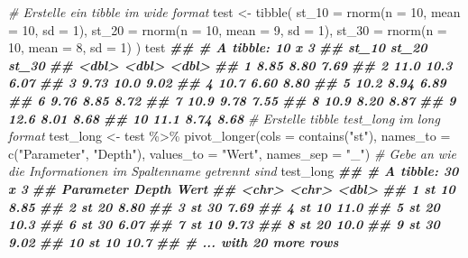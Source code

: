 \documentclass[
]{article}
\newenvironment{Shaded}{\begin{snugshade}}{\end{snugshade}}
\newcommand{\AttributeTok}[1]{\textcolor[rgb]{0.77,0.63,0.00}{#1}}
\newcommand{\CommentTok}[1]{\textcolor[rgb]{0.56,0.35,0.01}{\textit{#1}}}
\newcommand{\DecValTok}[1]{\textcolor[rgb]{0.00,0.00,0.81}{#1}}
\newcommand{\DocumentationTok}[1]{\textcolor[rgb]{0.56,0.35,0.01}{\textbf{\textit{#1}}}}
\newcommand{\FunctionTok}[1]{\textcolor[rgb]{0.00,0.00,0.00}{#1}}
\newcommand{\NormalTok}[1]{#1}
\newcommand{\OtherTok}[1]{\textcolor[rgb]{0.56,0.35,0.01}{#1}}
\newcommand{\SpecialCharTok}[1]{\textcolor[rgb]{0.00,0.00,0.00}{#1}}
\newcommand{\StringTok}[1]{\textcolor[rgb]{0.31,0.60,0.02}{#1}}
\begin{document}
\begin{Shaded}
\begin{Highlighting}[]
\CommentTok{\# Erstelle ein tibble im wide format}
\NormalTok{test }\OtherTok{\textless{}{-}} \FunctionTok{tibble}\NormalTok{(}
  \AttributeTok{st\_10 =} \FunctionTok{rnorm}\NormalTok{(}\AttributeTok{n =} \DecValTok{10}\NormalTok{, }\AttributeTok{mean =} \DecValTok{10}\NormalTok{, }\AttributeTok{sd =} \DecValTok{1}\NormalTok{), }
  \AttributeTok{st\_20 =} \FunctionTok{rnorm}\NormalTok{(}\AttributeTok{n =} \DecValTok{10}\NormalTok{, }\AttributeTok{mean =} \DecValTok{9}\NormalTok{, }\AttributeTok{sd =} \DecValTok{1}\NormalTok{), }
  \AttributeTok{st\_30 =} \FunctionTok{rnorm}\NormalTok{(}\AttributeTok{n =} \DecValTok{10}\NormalTok{, }\AttributeTok{mean =} \DecValTok{8}\NormalTok{, }\AttributeTok{sd =} \DecValTok{1}\NormalTok{) }
\NormalTok{)}
\NormalTok{test}
\DocumentationTok{\#\# \# A tibble: 10 x 3}
\DocumentationTok{\#\#    st\_10 st\_20 st\_30}
\DocumentationTok{\#\#    \textless{}dbl\textgreater{} \textless{}dbl\textgreater{} \textless{}dbl\textgreater{}}
\DocumentationTok{\#\#  1  8.85  8.80  7.69}
\DocumentationTok{\#\#  2 11.0  10.3   6.07}
\DocumentationTok{\#\#  3  9.73 10.0   9.02}
\DocumentationTok{\#\#  4 10.7   6.60  8.80}
\DocumentationTok{\#\#  5 10.2   8.94  6.89}
\DocumentationTok{\#\#  6  9.76  8.85  8.72}
\DocumentationTok{\#\#  7 10.9   9.78  7.55}
\DocumentationTok{\#\#  8 10.9   8.20  8.87}
\DocumentationTok{\#\#  9 12.6   8.01  8.68}
\DocumentationTok{\#\# 10 11.1   8.74  8.68}
\CommentTok{\# Erstelle tibble test\_long im long format}
\NormalTok{test\_long }\OtherTok{\textless{}{-}}\NormalTok{ test }\SpecialCharTok{\%\textgreater{}\%}
  \FunctionTok{pivot\_longer}\NormalTok{(}\AttributeTok{cols =} \FunctionTok{contains}\NormalTok{(}\StringTok{"st"}\NormalTok{), }\AttributeTok{names\_to =} \FunctionTok{c}\NormalTok{(}\StringTok{"Parameter"}\NormalTok{, }\StringTok{"Depth"}\NormalTok{), }\AttributeTok{values\_to =} \StringTok{"Wert"}\NormalTok{, }\AttributeTok{names\_sep =} \StringTok{"\_"}\NormalTok{) }\CommentTok{\# Gebe an wie die Informationen im Spaltenname getrennt sind}
\NormalTok{test\_long}
\DocumentationTok{\#\# \# A tibble: 30 x 3}
\DocumentationTok{\#\#    Parameter Depth  Wert}
\DocumentationTok{\#\#    \textless{}chr\textgreater{}     \textless{}chr\textgreater{} \textless{}dbl\textgreater{}}
\DocumentationTok{\#\#  1 st        10     8.85}
\DocumentationTok{\#\#  2 st        20     8.80}
\DocumentationTok{\#\#  3 st        30     7.69}
\DocumentationTok{\#\#  4 st        10    11.0 }
\DocumentationTok{\#\#  5 st        20    10.3 }
\DocumentationTok{\#\#  6 st        30     6.07}
\DocumentationTok{\#\#  7 st        10     9.73}
\DocumentationTok{\#\#  8 st        20    10.0 }
\DocumentationTok{\#\#  9 st        30     9.02}
\DocumentationTok{\#\# 10 st        10    10.7 }
\DocumentationTok{\#\# \# ... with 20 more rows}
\end{Highlighting}
\end{Shaded}
\end{document}
